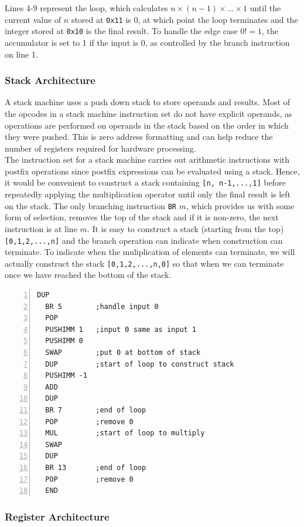 \documentclass[a4paper, 12pt, oneside]{book}
\begin{document}
Lines 4-9 represent the loop, which calculates $n\times(n-1)\times...\times1$ until the current value of $n$ stored at \texttt{0x11} is 0, at which point the loop terminates and the integer stored at \texttt{0x10} is the final result. To handle the edge case $0! = 1$, the accumulator is set to 1 if the input is 0, as controlled by the branch instruction on line 1.

\subsubsection{Stack Architecture}
A stack machine uses a push down stack to store operands and results. Most of the opcodes in a stack machine instruction set do not have explicit operands, as operations are performed on operands in the stack based on the order in which they were pushed. This is zero address formatting and can help reduce the number of registers required for hardware processing.\\

The instruction set for a stack machine carries out arithmetic instructions with postfix operations since postfix expressions can be evaluated using a stack. Hence, it would be convenient to construct a stack containing \texttt{[n, n-1,...,1]} before repeatedly applying the multiplication operator until only the final result is left on the stack. The only branching instruction \texttt{BR} $m$, which provides us with some form of selection, removes the top of the stack and if it is non-zero, the next instruction is at line $m$. It is easy to construct a stack (starting from the top) \texttt{[0,1,2,...,n]} and the branch operation can indicate when construction can terminate. To indicate when the muliplication of elements can terminate, we will actually construct the stack \texttt{[0,1,2,...,n,0]} so that when we can terminate once we have reached the bottom of the stack.

\begin{Verbatim}[numbers=left,xleftmargin=5mm]
  DUP
  BR 5        ;handle input 0
  POP
  PUSHIMM 1   ;input 0 same as input 1
  PUSHIMM 0
  SWAP        ;put 0 at bottom of stack
  DUP         ;start of loop to construct stack
  PUSHIMM -1
  ADD
  DUP
  BR 7        ;end of loop
  POP         ;remove 0
  MUL         ;start of loop to multiply
  SWAP
  DUP
  BR 13       ;end of loop
  POP         ;remove 0
  END
\end{Verbatim}

\subsubsection{Register Architecture}
\end{document}
